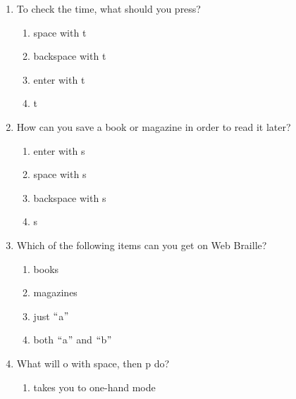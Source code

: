 \documentclass[10pt,letterpaper,twoside]{report}
\begin{document}
{{{{\begin{enumerate}
	\item To check the time, what should you press?
	      
	      \begin{enumerate}
		      \item space with t
		            
		      \item backspace with t
		            
		      \item enter with t
		            
		      \item t
		            
		            
	      \end{enumerate}
	\item How can you save a book or magazine in order to read it later?
	      
	      \begin{enumerate}
		      \item enter with s
		            
		      \item space with s
		            
		      \item backspace with s
		            
		      \item s
		            
		            
	      \end{enumerate}
	\item Which of the following items can you get on Web Braille?
	      
	      \begin{enumerate}
		      \item books
		            
		      \item magazines
		            
		      \item just $``$a$"$
		            
		      \item both $``$a$"$  and $``$b$"$
		            
		            
	      \end{enumerate}
	\item What will o with space, then p do?
	      
	      \begin{enumerate}
		      \item takes you to one-hand mode
		            

\end{enumerate}
\end{enumerate}}}}}
\end{document}

